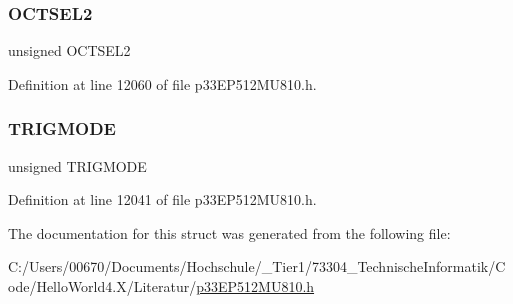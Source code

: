 \subsubsection{\texorpdfstring{O\+C\+T\+S\+E\+L2}{OCTSEL2}}
{\footnotesize\ttfamily unsigned O\+C\+T\+S\+E\+L2}



Definition at line 12060 of file p33\+E\+P512\+M\+U810.\+h.

\mbox{\label{structtag_o_c14_c_o_n1_b_i_t_s_a7a0057e0dca6e2663584b5b9e1da04c3}} 
\subsubsection{\texorpdfstring{T\+R\+I\+G\+M\+O\+DE}{TRIGMODE}}
{\footnotesize\ttfamily unsigned T\+R\+I\+G\+M\+O\+DE}



Definition at line 12041 of file p33\+E\+P512\+M\+U810.\+h.



The documentation for this struct was generated from the following file\+:\begin{DoxyCompactItemize}
\item 
C\+:/\+Users/00670/\+Documents/\+Hochschule/\+\_\+\+Tier1/73304\+\_\+\+Technische\+Informatik/\+Code/\+Hello\+World4.\+X/\+Literatur/\hyperlink{p33_e_p512_m_u810_8h}{p33\+E\+P512\+M\+U810.\+h}\end{DoxyCompactItemize}
